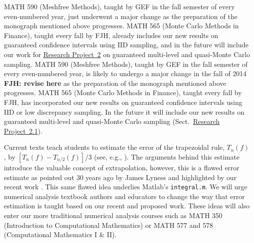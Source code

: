 \documentclass[11pt]{NSFamsart}
\newcommand{\Matlab}{{\sc Matlab}\xspace}
\newcommand{\refprobb}{\hyperref[SectGAIL]{Research Project~2}\xspace}
\newcommand{\refprobba}{\hyperref[Integrationsubsec]{Research Project~2.1}\xspace}
\begin{document}
\begin{description}[leftmargin=0ex]
\item[Refreshing Course Syllabi]
MATH 590 (Meshfree Methods), taught by GEF in the fall semester of every even-numbered year, just underwent a major change as the preparation of the monograph mentioned above progresses. MATH 565 (Monte Carlo Methods in Finance), taught every fall by FJH, already includes our new results on guaranteed confidence intervals using IID sampling, and in the future will include our work for \refprobb on guaranteed multi-level and quasi-Monte Carlo sampling.
MATH 590 (Meshfree Methods), taught by GEF in the fall semester of every even-numbered year, is likely to undergo a major change in the fall of 2014 \textbf{FJH: revise here} as the preparation of the monograph mentioned above progresses. MATH 565 (Monte Carlo Methods in Finance), taught every fall by FJH, has incorporated our new results on guaranteed confidence intervals using IID or low discrepancy sampling. In the future it will include our new results on guaranteed multi-level and quasi-Monte Carlo sampling (Sect.\ \refprobba).

Current texts teach students to estimate the error of the trapezoidal rule, $T_n(f)$, by $[T_n(f)-T_{n/2}(f)]/3$ (see, e.g., \cite[p.\ 223--224]{BurFai10}).  The arguments behind this estimate introduce the valuable concept of extrapolation, however, this is a flawed error estimate as pointed out $30$ years ago by James Lyness \cite{Lyn83} and highlighted by our recent work \cite{HicEtal14b}.  This same flawed idea underlies \Matlab's {\tt integral.m}.  We will urge numerical analysis textbook authors and educators to change the way that error estimation is taught based on our recent and proposed work.  These ideas will also enter our more traditional numerical analysis courses such as MATH 350 (Introduction to Computational Mathematics) or MATH 577 and 578 (Computational Mathematics I \& II).


\end{description}
\end{document}
